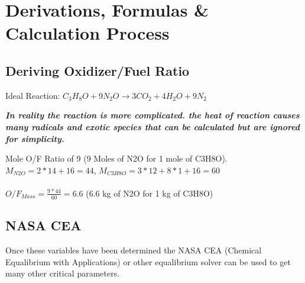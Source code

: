 \documentclass[12pt, letter paper]{article}
\begin{document}
	\section{Derivations, Formulas \& Calculation Process}
		
		\subsection{Deriving Oxidizer/Fuel Ratio}
			Ideal Reaction: 
			$ C_3H_8O + 9N_2O \rightarrow 3CO_2 + 4H_2O + 9N_2 $ 
			\begin{center}
			\textbf{\textit{In reality the reaction is more complicated. the heat of reaction causes many radicals and exotic species that can be calculated but are ignored for simplicity.}} 
			\end{center}
			\noindent Mole O/F Ratio of 9 (9 Moles of N2O for 1 mole of C3H8O). \\
			$ M_{N2O} = 2*14 + 16 = 44 $, 
			$ M_{C3H8O} = 3*12 + 8*1 + 16 =60 $ \\ \\
			$O/F_{Mass} = \frac{9*44}{60} = 6.6 $ (6.6 kg of N2O for 1 kg of C3H8O)
		
		\subsection{NASA CEA}
			Once these variables have been determined the NASA CEA (Chemical Equalibrium with Applications) or other equalibrium solver can be used to get many other critical parameters.
\end{document}
